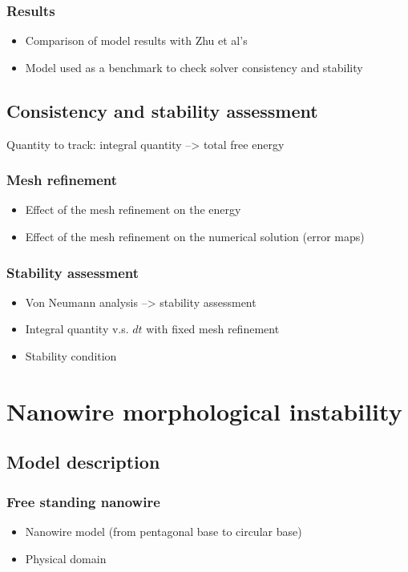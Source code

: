         \subsubsection{Results}
        \begin{itemize}
            \item Comparison of model results with Zhu et al's
            \item Model used as a benchmark to check solver consistency and stability
        \end{itemize}
    \subsection{Consistency and stability assessment}
        Quantity to track: integral quantity --> total free energy
        \subsubsection{Mesh refinement}
        \begin{itemize}
            \item Effect of the mesh refinement on the energy
            \item Effect of the mesh refinement on the numerical solution (error maps)
        \end{itemize}
        \subsubsection{Stability assessment}
        \begin{itemize}
            \item Von Neumann analysis --> stability assessment
            \item Integral quantity v.s. $dt$ with fixed mesh refinement
            \item Stability condition
        \end{itemize}
\section{Nanowire morphological instability}
    \subsection{Model description}
        \subsubsection{Free standing nanowire}
        \begin{itemize}
            \item Nanowire model (from pentagonal base to circular base)
            \item Physical domain
        \end{itemize}
